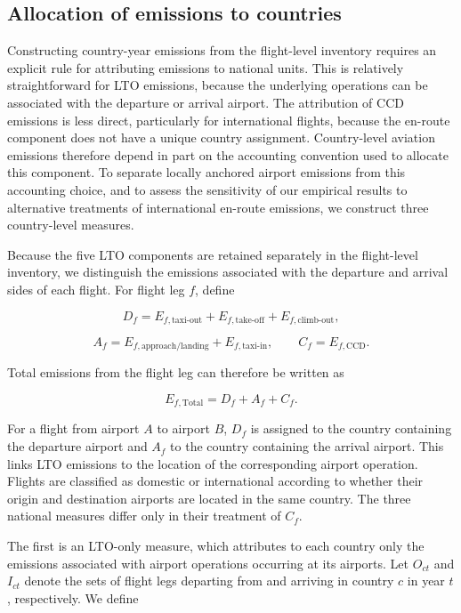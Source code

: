 \documentclass[12pt]{extarticle}
\begin{document}
\subsection*{Allocation of emissions to countries}

Constructing country-year emissions from the flight-level inventory requires an explicit rule for attributing emissions to national units. This is relatively straightforward for LTO emissions, because the underlying operations can be associated with the departure or arrival airport. The attribution of CCD emissions is less direct, particularly for international flights, because the en-route component does not have a unique country assignment. Country-level aviation emissions therefore depend in part on the accounting convention used to allocate this component. To separate locally anchored airport emissions from this accounting choice, and to assess the sensitivity of our empirical results to alternative treatments of international en-route emissions, we construct three country-level measures.

Because the five LTO components are retained separately in the flight-level inventory, we distinguish the emissions associated with the departure and arrival sides of each flight. For flight leg $f$, define

\[
D_f
=
E_{f,\mathrm{taxi\mbox{-}out}}
+
E_{f,\mathrm{take\mbox{-}off}}
+
E_{f,\mathrm{climb\mbox{-}out}},
\]

\[
A_f
=
E_{f,\mathrm{approach/landing}}
+
E_{f,\mathrm{taxi\mbox{-}in}},
\qquad
C_f
=
E_{f,\mathrm{CCD}}.
\]

Total emissions from the flight leg can therefore be written as

\begin{equation}
E_{f,\mathrm{Total}}
=
D_f+A_f+C_f .
\label{eq:nature_4}
\end{equation}

For a flight from airport $A$ to airport $B$, $D_f$ is assigned to the country containing the departure airport and $A_f$ to the country containing the arrival airport. This links LTO emissions to the location of the corresponding airport operation. Flights are classified as domestic or international according to whether their origin and destination airports are located in the same country. The three national measures differ only in their treatment of $C_f$.

The first is an LTO-only measure, which attributes to each country only the emissions associated with airport operations occurring at its airports. Let $O_{ct}$ and $I_{ct}$ denote the sets of flight legs departing from and arriving in country $c$ in year $t$, respectively. We define
\end{document}

